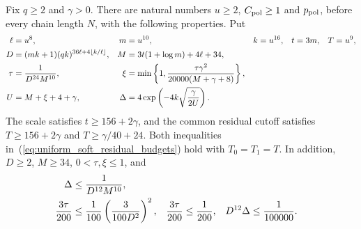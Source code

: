 \begin{corollary}
    \label{cor:calibrated_uniform_physical_soft_family}
    \leanok
    Fix $q\ge2$ and $\gamma>0$. There are natural numbers
    $u\ge2$, $C_{\rm pol}\ge1$ and $p_{\rm pol}$, before every chain
    length $N$, with the following properties. Put
    \begin{align}
        \ell   & =u^8,                                                               & m & =u^{10},    & k & =u^{16}, &
        t      & =3m,                                                                & T & =u^9,\notag                  \\
        D      & =(mk+1)(qk)^{36\ell+4\lfloor k/\ell\rfloor},                        &
        M      & =3t(1+\log m)+4\ell+34,\notag                                                                          \\
        \tau   & =\frac1{D^{24}M^{10}},                                              &
        \xi    & =\min\left\{1,\frac{\tau\gamma^2}{20000(M+\gamma+8)}\right\},\notag                                    \\
        U      & =M+\xi+4+\gamma,                                                    &
        \Delta & =4\exp\left(-4k\sqrt{\frac{\gamma}{2U}}\right).
        \label{eq:calibrated_soft_parameters}
    \end{align}
    The scale satisfies $t\ge156+2\gamma$, and the common residual
    cutoff satisfies $T\ge156+2\gamma$ and $T\ge\gamma/40+24$.
    Both inequalities in~(\ref{eq:uniform_soft_residual_budgets}) hold
    with $T_0=T_1=T$. In addition, $D\ge2$, $M\ge34$,
    $0<\tau,\xi\le1$, and
    \begin{align}
        \Delta            & \le\frac1{D^{12}M^{10}},\notag                   \\
        \frac{3\tau}{200}
                          & \le\frac1{100}\left(\frac{3}{100D^2}\right)^2, &
        \frac{3\tau}{200} & \le\frac1{200},                                &
        D^{12}\Delta      & \le\frac1{100000}.
        \label{eq:calibrated_soft_sampling}
    \end{align}


\end{corollary}
